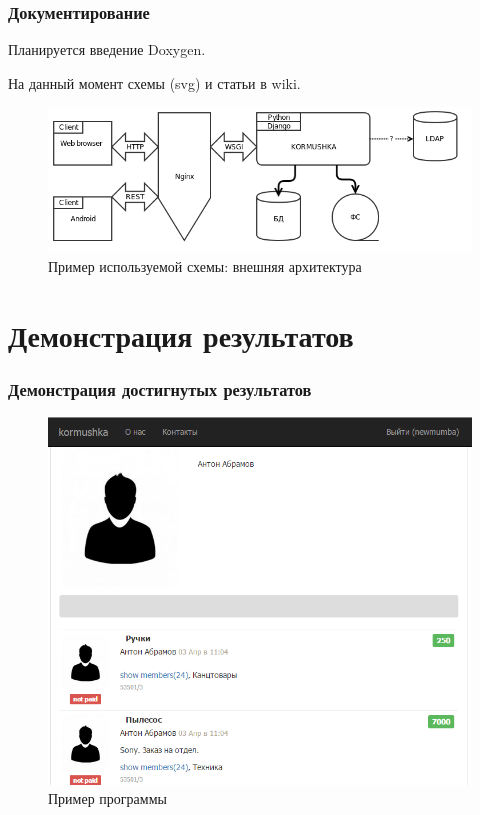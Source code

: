 \documentclass{beamer}
\begin{document}
\begin{frame}
\frametitle{Документирование}

Планируется введение Doxygen.

На данный момент схемы (svg) и статьи в wiki.

\begin{figure}
\includegraphics[scale=0.60]{res/r2_kormushka_ext}
\caption{Пример используемой схемы: внешняя архитектура}
\end{figure}


\end{frame}


\section{Демонстрация результатов}

\begin{frame}
\frametitle{Демонстрация достигнутых результатов}

\begin{figure}[h!]
\includegraphics[scale=0.40]{res/r2_result}
\caption{Пример программы}
\end{figure}

\end{frame}
\end{document}
